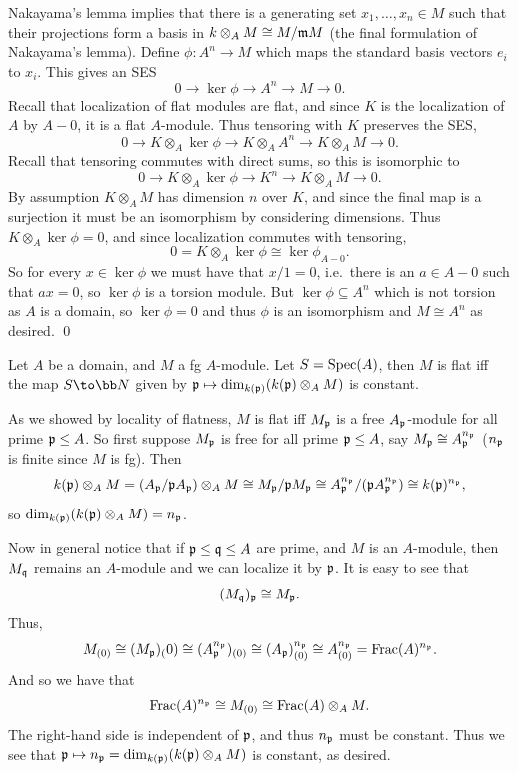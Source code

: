     Nakayama's lemma implies that there is a generating set $x_1,\dots,x_n\in M$ such that their projections form a basis in $k\otimes_AM\cong M/{{\frak m}} M$
    (the final formulation of Nakayama's lemma).
    Define $\phi\colon A^n\to M$ which maps the standard basis vectors $e_i$ to $x_i$.
    This gives an SES
    $$ 0 \to \ker\phi \to A^n \to M \to 0 . $$
    Recall that localization of flat modules are flat, and since $K$ is the localization of $A$ by $A-0$, it is a flat $A$-module.
    Thus tensoring with $K$ preserves the SES,
    $$ 0 \to K\otimes_A\ker\phi \to K\otimes_AA^n \to K\otimes_AM \to 0 . $$
    Recall that tensoring commutes with direct sums, so this is isomorphic to
    $$ 0 \to K\otimes_A\ker\phi \to K^n \to K\otimes_AM \to 0 . $$
    By assumption $K\otimes_AM$ has dimension $n$ over $K$, and since the final map is a surjection it must be an isomorphism by considering dimensions.
    Thus $K\otimes_A\ker\phi=0$, and since localization commutes with tensoring,
    $$ 0 = K\otimes_A\ker\phi \cong \ker\phi_{A-0} . $$
    So for every $x\in\ker\phi$ we must have that $x/1=0$, i.e.\ there is an $a\in A-0$ such that $ax=0$, so $\ker\phi$ is a torsion module.
    But $\ker\phi\subseteq A^n$ which is not torsion as $A$ is a domain, so $\ker\phi=0$ and thus $\phi$ is an isomorphism and $M\cong A^n$ as desired.
    \qed

\eproof

\bthrm[title=Fiber dimension criterion for flatness]

    Let $A$ be a domain, and $M$ a fg $A$-module.
    Let $S={\rm Spec}(A)$, then $M$ is flat iff the map $S\to\bN$ given by ${{\frak p}}\mapsto\dim_{k({{\frak p}})}(k({{\frak p}})\otimes_AM)$ is constant.

\ethrm

\bproof

    As we showed by locality of flatness, $M$ is flat iff $M_{{\frak p}}$ is a free $A_{{\frak p}}$-module for all prime ${{\frak p}}\leq A$.
    So first suppose $M_{{\frak p}}$ is free for all prime ${{\frak p}}\leq A$, say $M_{{\frak p}}\cong A_{{\frak p}}^{n_{{\frak p}}}$ ($n_{{\frak p}}$ is finite since $M$ is fg).
    Then
    $$ k({{\frak p}}) \otimes_A M = (A_{{\frak p}}/{{\frak p}} A_{{\frak p}}) \otimes_A M \cong M_{{\frak p}}/{{\frak p}} M_{{\frak p}} \cong A_{{\frak p}}^{n_{{\frak p}}}/({{\frak p}} A_{{\frak p}}^{n_{{\frak p}}}) \cong k({{\frak p}})^{n_{{\frak p}}} , $$
    so $\dim_{k({{\frak p}})}(k({{\frak p}})\otimes_AM)=n_{{\frak p}}$.
    
    Now in general notice that if ${{\frak p}}\leq{{\frak q}}\leq A$ are prime, and $M$ is an $A$-module, then $M_{{\frak q}}$ remains an $A$-module and we can localize it by ${{\frak p}}$.
    It is easy to see that
    $$ (M_{{\frak q}})_{{\frak p}} \cong M_{{\frak p}} . $$
    Thus,
    $$ M_{(0)} \cong (M_{{\frak p}})_(0) \cong (A_{{\frak p}}^{n_{{\frak p}}})_{(0)} \cong (A_{{\frak p}})_{(0)}^{n_{{\frak p}}} \cong A_{(0)}^{n_{{\frak p}}} = {\rm Frac}(A)^{n_{{\frak p}}} . $$
    And so we have that
    $$ {\rm Frac}(A)^{n_{{\frak p}}} \cong M_{(0)} \cong {\rm Frac}(A)\otimes_AM . $$
    The right-hand side is independent of ${{\frak p}}$, and thus $n_{{\frak p}}$ must be constant.
    Thus we see that ${{\frak p}}\mapsto n_{{\frak p}}=\dim_{k({{\frak p}})}(k({{\frak p}})\otimes_AM)$ is constant, as desired.

